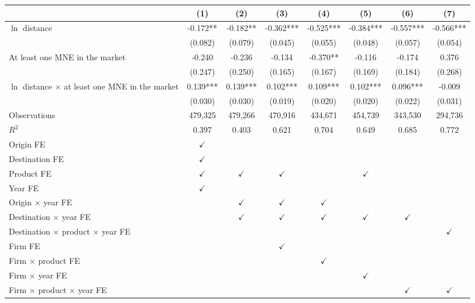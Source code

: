 \begin{tabular}{l*{7}{c}}
\toprule
 & (1) & (2) & (3) & (4) & (5) & (6) & (7) \\
\midrule
$\ln$ distance & -0.172** & -0.182** & -0.362*** & -0.525*** & -0.384*** & -0.557*** & -0.566*** \\
 & (0.082) & (0.079) & (0.045) & (0.055) & (0.048) & (0.057) & (0.054) \\
At least one MNE in the market & -0.240 & -0.236 & -0.134 & -0.370** & -0.116 & -0.174 & 0.376 \\
 & (0.247) & (0.250) & (0.165) & (0.167) & (0.169) & (0.184) & (0.268) \\
$\ln$ distance $\times$ at least one MNE in the market & 0.139*** & 0.139*** & 0.102*** & 0.109*** & 0.102*** & 0.096*** & -0.009 \\
 & (0.030) & (0.030) & (0.019) & (0.020) & (0.020) & (0.022) & (0.031) \\
Observations & 479,325 & 479,266 & 470,916 & 434,671 & 454,739 & 343,530 & 294,736 \\
$R^2$ & 0.397 & 0.403 & 0.621 & 0.704 & 0.649 & 0.685 & 0.772 \\
\midrule
Origin FE & $\checkmark$ &  &  &  &  &  &  \\
Destination FE & $\checkmark$ &  &  &  &  &  &  \\
Product FE & $\checkmark$ & $\checkmark$ & $\checkmark$ &  & $\checkmark$ &  &  \\
Year FE & $\checkmark$ &  &  &  &  &  &  \\
Origin $\times$ year FE &  & $\checkmark$ & $\checkmark$ & $\checkmark$ &  &  &  \\
Destination $\times$ year FE &  & $\checkmark$ & $\checkmark$ & $\checkmark$ & $\checkmark$ & $\checkmark$ &  \\
Destination $\times$ product $\times$ year FE &  &  &  &  &  &  & $\checkmark$ \\
Firm FE &  &  & $\checkmark$ &  &  &  &  \\
Firm $\times$ product FE &  &  &  & $\checkmark$ &  &  &  \\
Firm $\times$ year FE &  &  &  &  & $\checkmark$ &  &  \\
Firm $\times$ product $\times$ year FE &  &  &  &  &  & $\checkmark$ & $\checkmark$ \\
\bottomrule
\end{tabular}
